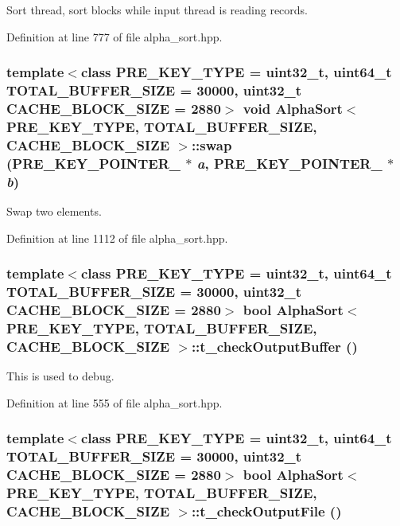 Sort thread, sort blocks while input thread is reading records. 

Definition at line 777 of file alpha\_\-sort.hpp.\hypertarget{classAlphaSort_55c4e70b6d0d4b9b7cc15a2afe319dae}{
\subsubsection[{swap}]{\setlength{\rightskip}{0pt plus 5cm}template$<$class PRE\_\-KEY\_\-TYPE  = uint32\_\-t, uint64\_\-t TOTAL\_\-BUFFER\_\-SIZE = 30000, uint32\_\-t CACHE\_\-BLOCK\_\-SIZE = 2880$>$ void {\bf AlphaSort}$<$ PRE\_\-KEY\_\-TYPE, TOTAL\_\-BUFFER\_\-SIZE, CACHE\_\-BLOCK\_\-SIZE $>$::swap (PRE\_\-KEY\_\-POINTER\_\- $\ast$ {\em a}, \/  PRE\_\-KEY\_\-POINTER\_\- $\ast$ {\em b})}}
\label{classAlphaSort_55c4e70b6d0d4b9b7cc15a2afe319dae}


Swap two elements. 

Definition at line 1112 of file alpha\_\-sort.hpp.\hypertarget{classAlphaSort_f1e2b4f06dec49fb43a73b98e2cccdde}{
\subsubsection[{t\_\-checkOutputBuffer}]{\setlength{\rightskip}{0pt plus 5cm}template$<$class PRE\_\-KEY\_\-TYPE  = uint32\_\-t, uint64\_\-t TOTAL\_\-BUFFER\_\-SIZE = 30000, uint32\_\-t CACHE\_\-BLOCK\_\-SIZE = 2880$>$ bool {\bf AlphaSort}$<$ PRE\_\-KEY\_\-TYPE, TOTAL\_\-BUFFER\_\-SIZE, CACHE\_\-BLOCK\_\-SIZE $>$::t\_\-checkOutputBuffer ()}}
\label{classAlphaSort_f1e2b4f06dec49fb43a73b98e2cccdde}


This is used to debug. 

Definition at line 555 of file alpha\_\-sort.hpp.\hypertarget{classAlphaSort_406796e2994f09efa3c0ed24db7206a9}{
\subsubsection[{t\_\-checkOutputFile}]{\setlength{\rightskip}{0pt plus 5cm}template$<$class PRE\_\-KEY\_\-TYPE  = uint32\_\-t, uint64\_\-t TOTAL\_\-BUFFER\_\-SIZE = 30000, uint32\_\-t CACHE\_\-BLOCK\_\-SIZE = 2880$>$ bool {\bf AlphaSort}$<$ PRE\_\-KEY\_\-TYPE, TOTAL\_\-BUFFER\_\-SIZE, CACHE\_\-BLOCK\_\-SIZE $>$::t\_\-checkOutputFile ()}}
\label{classAlphaSort_406796e2994f09efa3c0ed24db7206a9}


